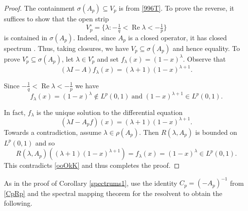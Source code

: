 \documentclass[11pt]{amsart}
\numberwithin{equation}{section}
\theoremstyle{plain}
\theoremstyle{definition}
\renewcommand{\subset}{\subseteq}
\renewcommand{\Re}[1]{\operatorname{Re} #1 }
\newcommand{\0}{{\color{lightgray}0}}
\begin{document}
\begin{proof}
The containment 
$\sigma(A_p) \subseteq V_p $  is from  \eqref{996T}. To prove the reverse, it suffices to show that  the open strip
$$
V_p^\circ = \{\lambda: -\tfrac{1}{q} < \Re \lambda < -\tfrac{1}{p}\}
$$
is contained in $\sigma(A_p)$. Indeed, since $A_p$ is a closed operator, it has closed spectrum \cite[p.~240]{MR1721989}. Thus, taking closures, we have $V_p \subseteq \sigma(A_p)$ and hence equality. 
To prove $V_{p}^{\circ} \subset \sigma(A_p)$,  let  $\lambda \in V_p^\circ$ and set 
$f_\lambda(x) = (1-x)^\lambda.$ Observe that 
$$
(\lambda I - A) f_\lambda(x) = (\lambda + 1)(1-x)^{\lambda+1}.$$

Since $-\frac{1}{q} < \Re \lambda < -\frac{1}{p}$ we have
\begin{equation}\label{ooOkK}
f_\lambda(x) = (1-x)^\lambda \notin L^p(0,1)
 \; \mbox{and} \; (1-x)^{\lambda+1} \in L^p(0,1).
 \end{equation}

In fact, $f_\lambda$ is the unique solution to the differential equation
$$
(\lambda I - A_p f)(x) = (\lambda + 1)(1-x)^{\lambda+1}.
$$
Towards a contradiction, assume $\lambda \in \rho(A_p)$. Then 
$
R(\lambda, A_p)
$
is bounded on $L^p(0, 1)$ and so 
$$
R(\lambda, A_p)((\lambda + 1)(1-x)^{\lambda+1}) = f_\lambda(x) = (1-x)^\lambda \in L^p(0,1).
$$
This contradicts \eqref{ooOkK} and thus completes the proof.
\end{proof}

As in the proof of Corollary \ref{spectrums1}, use the identity $C_p=(-A_p)^{-1}$ from \eqref{CpRp} and the spectral mapping theorem for the resolvent \cite[p.~243]{MR1721989} to obtain the following. 
\end{document}
